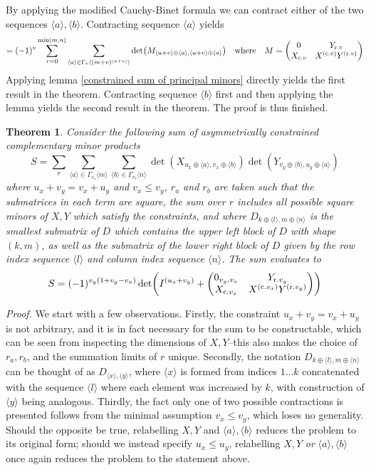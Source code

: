 \documentclass[12pt]{article}
\newcommand{\seq}[1]{\langle #1\rangle}
\newtheorem{theorem}{Theorem}[section]
\begin{document}
	By applying the modified Cauchy-Binet formula \cite[App. C]{modified_cauchy_binet} we can contract either of the two sequences $\seq{a},\seq{b}$. Contracting sequence $\seq{a}$ yields
	\begin{equation}
	=(-1)^v\sum_{r=0}^{\min(m,n)}\sum_{\seq{a}\in\Gamma_r\seq{(m+v)^{(u+v)}}}\det(M_{\seq{u+v}\oplus\seq{a},\seq{u+v}\oplus\seq{a}})\qq{where}M=\mqty(0 & Y_{\text{r.} v} \\ X_{\text{c.} v} & X^{(\text{c.} v)}Y^{(\text{r.} v)})
	\end{equation}
	Applying lemma \ref{constrained sum of principal minors} directly yields the first result in the theorem. Contracting sequence $\seq{b}$ first and then applying the lemma yields the second result in the theorem. The proof is thus finished.
	
	\begin{theorem}
	Consider the following sum of asymmetrically constrained complementary minor products
	\begin{equation}
	S=\sum_{r}\sum_{\seq{a}\in\Gamma_{r_a}\seq{m}}\sum_{\seq{b}\in\Gamma_{r_b}\seq{n}}\det(X_{u_x\oplus\seq{a},v_x\oplus\seq{b}})\det(Y_{v_y\oplus\seq{b},u_y\oplus\seq{a}})
	\end{equation}
	where $u_x+v_y=v_x+u_y$ and $v_x\leq v_y$, $r_a$ and $r_b$ are taken such that the submatrices in each term are square, the sum over $r$ includes all possible square minors of $X,Y$ which satisfy the constraints, and where $D_{k\oplus\seq{l},m\oplus\seq{n}}$ is the smallest submatrix of $D$ which contains the upper left block of $D$ with shape $(k,m)$, as well as the submatrix of the lower right block of $D$ given by the row index sequence $\seq{l}$ and column index sequence $\seq{n}$. The sum evaluates to
	\begin{equation}
	S=(-1)^{v_y(1+v_y-v_x)}\det(I^{(u_x+v_y)}+\mqty(
		0_{v_y,v_x} & Y_{\text{r.} v_y}\\
		X_{\text{c.} v_x} & X^{(\text{c.} v_x)} Y^{(\text{r.} v_y)}
	))
	\end{equation}
	\end{theorem}
	\textit{Proof.} We start with a few observations. Firstly, the constraint $u_x+v_y=v_x+u_y$ is not arbitrary, and it is in fact necessary for the sum to be constructable, which can be seen from inspecting the dimensions of $X,Y$--this also makes the choice of $r_a,r_b$, and the summation limits of $r$ unique. Secondly, the notation $D_{k\oplus\seq{l},m\oplus\seq{n}}$ can be thought of as $D_{\seq{x},\seq{y}}$, where $\seq{x}$ is formed from indices $1\dots k$ concatenated with the sequence $\seq{l}$ where each element was increased by $k$, with construction of $\seq{y}$ being analogous. Thirdly, the fact only one of two possible contractions is presented follows from the minimal assumption $v_x\leq v_y$, which loses no generality. Should the opposite be true, relabelling $X,Y$ and $\seq{a},\seq{b}$ reduces the problem to its original form; should we instead specify $u_x\leq u_y$, relabelling $X,Y$ \textit{or} $\seq{a},\seq{b}$ once again reduces the problem to the statement above.
	
\end{document}
